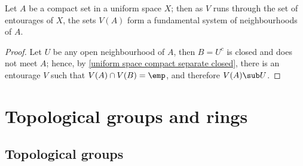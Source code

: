 \begin{corollary}\label{uniform space compact subset nbhd by entourage}
Let $A$ be a compact set in a uniform space $X$; then as $V$ runs through the set of entourages of $X$, the sets $V(A)$ form a fundamental system of neighbourhoods of $A$.
\end{corollary}
\begin{proof}
Let $U$ be any open neighbourhood of $A$, then $B=U^c$ is closed and does not meet $A$; hence, by \cref{uniform space compact separate closed}, there is an entourage $V$ such that $V(A)\cap V(B)=\emp$, and therefore $V(A)\sub U$.
\end{proof}
\chapter{Topological groups and rings}
\section{Topological groups}
